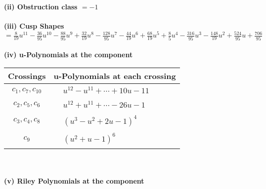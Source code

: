 \documentclass[1p]{elsarticle_modified}
\theoremstyle{definition}
\begin{document}
\flushleft \textbf{(ii) Obstruction class $= -1$}\\~\\
\flushleft \textbf{(iii) Cusp Shapes $= \frac{8}{19} u^{11}-\frac{36}{95} u^{10}-\frac{88}{95} u^9+\frac{32}{19} u^8-\frac{128}{95} u^7-\frac{44}{19} u^6+\frac{68}{19} u^5+\frac{8}{5} u^4-\frac{316}{95} u^3-\frac{148}{19} u^2+\frac{524}{95} u+\frac{706}{95}$}\\~\\
\newpage\renewcommand{\arraystretch}{1}
\flushleft \textbf{(iv) u-Polynomials at the component}\newline \\
\begin{tabular}{m{50pt}|m{274pt}}
Crossings & \hspace{64pt}u-Polynomials at each crossing \\
\hline $$\begin{aligned}c_{1},c_{7},c_{10}\end{aligned}$$&$\begin{aligned}
&u^{12}- u^{11}+\cdots+10 u-11
\end{aligned}$\\
\hline $$\begin{aligned}c_{2},c_{5},c_{6}\end{aligned}$$&$\begin{aligned}
&u^{12}+u^{11}+\cdots-26 u-1
\end{aligned}$\\
\hline $$\begin{aligned}c_{3},c_{4},c_{8}\end{aligned}$$&$\begin{aligned}
&(u^3- u^2+2 u-1)^4
\end{aligned}$\\
\hline $$\begin{aligned}c_{9}\end{aligned}$$&$\begin{aligned}
&(u^2+u-1)^6
\end{aligned}$\\
\hline
\end{tabular}\\~\\
\newpage\renewcommand{\arraystretch}{1}
\flushleft \textbf{(v) Riley Polynomials at the component}\newline \\
\end{document}

